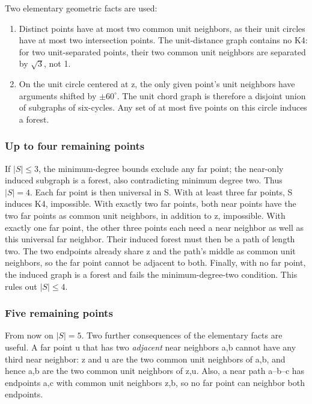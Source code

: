 \documentclass[
  11pt,
]{article}
\providecommand{\tightlist}{%
  \setlength{\itemsep}{0pt}\setlength{\parskip}{0pt}}
\begin{document}
Two elementary geometric facts are used:

\begin{enumerate}
\def\labelenumi{\arabic{enumi}.}
\tightlist
\item
  Distinct points have at most two common unit neighbors, as their unit
  circles have at most two intersection points. The unit-distance graph
  contains no K4: for two unit-separated points, their two common unit
  neighbors are separated by \(\sqrt{3}\), not 1.
\item
  On the unit circle centered at z, the only given point's unit
  neighbors have arguments shifted by \(\pm60^\circ\). The unit chord
  graph is therefore a disjoint union of subgraphs of six-cycles. Any
  set of at most five points on this circle induces a forest.
\end{enumerate}

\subsubsection{Up to four remaining
points}\label{up-to-four-remaining-points}

If \(|S|\le3\), the minimum-degree bounds exclude any far point; the
near-only induced subgraph is a forest, also contradicting minimum
degree two. Thus \(|S|=4\). Each far point is then universal in S. With
at least three far points, S induces K4, impossible. With exactly two
far points, both near points have the two far points as common unit
neighbors, in addition to z, impossible. With exactly one far point, the
other three points each need a near neighbor as well as this universal
far neighbor. Their induced forest must then be a path of length two.
The two endpoints already share z and the path's middle as common unit
neighbors, so the far point cannot be adjacent to both. Finally, with no
far point, the induced graph is a forest and fails the
minimum-degree-two condition. This rules out \(|S|\le4\).

\subsubsection{Five remaining points}\label{five-remaining-points}

From now on \(|S|=5\). Two further consequences of the elementary facts
are useful. A far point u that has two \emph{adjacent} near neighbors
a,b cannot have any third near neighbor: z and u are the two common unit
neighbors of a,b, and hence a,b are the two common unit neighbors of
z,u. Also, a near path a--b--c has endpoints a,c with common unit
neighbors z,b, so no far point can neighbor both endpoints.
\end{document}
